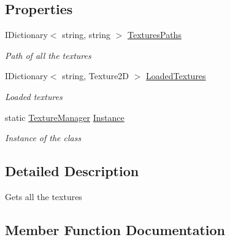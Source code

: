\subsection*{Properties}
\begin{DoxyCompactItemize}
\item 
I\+Dictionary$<$ string, string $>$ \hyperlink{class_hel_project_1_1_u_i_1_1_texture_manager_a0524c77f2c5fd5c6f3eb57645bf8a521}{Textures\+Paths}
\begin{DoxyCompactList}\small\item\em Path of all the textures \end{DoxyCompactList}\item 
I\+Dictionary$<$ string, Texture2\+D $>$ \hyperlink{class_hel_project_1_1_u_i_1_1_texture_manager_a57751418291b635f8c1f16f8ef9a1468}{Loaded\+Textures}
\begin{DoxyCompactList}\small\item\em Loaded textures \end{DoxyCompactList}\item 
static \hyperlink{class_hel_project_1_1_u_i_1_1_texture_manager}{Texture\+Manager} \hyperlink{class_hel_project_1_1_u_i_1_1_texture_manager_a583c9e38fd71caf9d6b1cf4a1543ca0a}{Instance}
\begin{DoxyCompactList}\small\item\em Instance of the class \end{DoxyCompactList}\end{DoxyCompactItemize}


\subsection{Detailed Description}
Gets all the textures 



\subsection{Member Function Documentation}
\hypertarget{class_hel_project_1_1_u_i_1_1_texture_manager_ae9be5cc8f6ffa84e48fdcc2a132cf6d0}{}
